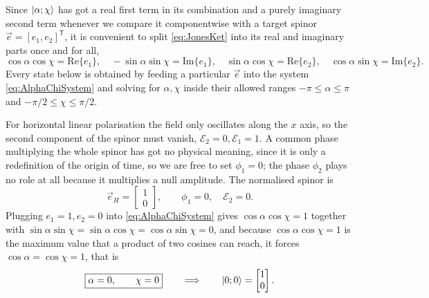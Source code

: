             Since $\ket{\alpha;\chi}$ has got a real first term in its combination and a purely imaginary second term whenever we compare it componentwise with a target spinor $\vec{e} = [e_1,e_2]^{\mathsf{T}}$, it is convenient to split \ref{eq:JonesKet} into its real and imaginary parts once and for all,
            \begin{equation}\label{eq:AlphaChiSystem}
                \cos\alpha\cos\chi = \text{Re}\{e_1\}, \quad -\sin\alpha\sin\chi = \text{Im}\{e_1\}, \quad \sin\alpha\cos\chi = \text{Re}\{e_2\}, \quad \cos\alpha\sin\chi = \text{Im}\{e_2\}.
            \end{equation}
            Every state below is obtained by feeding a particular $\vec{e}$ into the system \ref{eq:AlphaChiSystem} and solving for $\alpha,\chi$ inside their allowed ranges $-\pi\leq\alpha\leq\pi$ and $-\pi/2\leq\chi\leq\pi/2$.

            For horizontal linear polarisation the field only oscillates along the $x$ axis, so the second component of the spinor must vanish, $\mathcal{E}_2=0,\mathcal{E}_1=1$. A common phase multiplying the whole spinor has got no physical meaning, since it is only a redefinition of the origin of time, so we are free to set $\phi_1=0$; the phase $\phi_2$ plays no role at all because it multiplies a null amplitude. The normalised spinor is
            \begin{equation}\label{eq:JonesHoriz}
                \vec{e}_H = \begin{bmatrix}1\\0\end{bmatrix}, \qquad \phi_1=0,\quad \mathcal{E}_2=0.
            \end{equation}
            Plugging $e_1=1,e_2=0$ into \ref{eq:AlphaChiSystem} gives $\cos\alpha\cos\chi=1$ together with $\sin\alpha\sin\chi=\sin\alpha\cos\chi=\cos\alpha\sin\chi=0$, and because $\cos\alpha\cos\chi=1$ is the maximum value that a product of two cosines can reach, it forces $\cos\alpha=\cos\chi=1$, that is
            \begin{equation}\label{eq:HorizAngles}
                \boxed{\alpha=0,\qquad \chi=0} \qquad\Longrightarrow\qquad \ket{0;0}=\begin{bmatrix}1\\0\end{bmatrix}.
            \end{equation}

